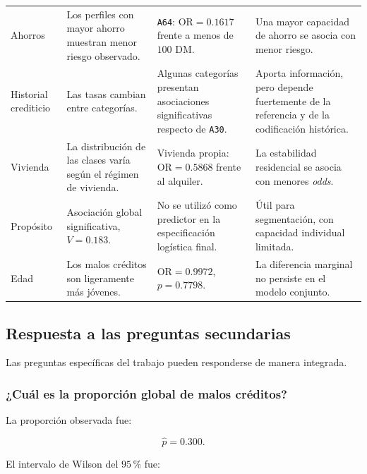 \begin{table}[H]
\begin{tabularx}{\textwidth}{
        @{}
        >{\raggedright\arraybackslash}p{2.7cm}
        >{\raggedright\arraybackslash}p{4.1cm}
        >{\raggedright\arraybackslash}p{4.0cm}
        X
        @{}
    }
        Ahorros
        & Los perfiles con mayor ahorro muestran menor riesgo observado.
        & \texttt{A64}: \(\mathrm{OR}=0.1617\) frente a menos de
          \(100\) DM.
        & Una mayor capacidad de ahorro se asocia con menor riesgo. \\

        Historial crediticio
        & Las tasas cambian entre categorías.
        & Algunas categorías presentan asociaciones significativas
          respecto de \texttt{A30}.
        & Aporta información, pero depende fuertemente de la referencia
          y de la codificación histórica. \\

        Vivienda
        & La distribución de las clases varía según el régimen de
          vivienda.
        & Vivienda propia:
          \(\mathrm{OR}=0.5868\) frente al alquiler.
        & La estabilidad residencial se asocia con menores
          \textit{odds}. \\

        Propósito
        & Asociación global significativa, \(V=0.183\).
        & No se utilizó como predictor en la especificación logística
          final.
        & Útil para segmentación, con capacidad individual limitada. \\

        Edad
        & Los malos créditos son ligeramente más jóvenes.
        & \(\mathrm{OR}=0.9972\), \(p=0.7798\).
        & La diferencia marginal no persiste en el modelo conjunto. \\

        \bottomrule
    \end{tabularx}
\end{table}

\subsection{Respuesta a las preguntas secundarias}

Las preguntas específicas del trabajo pueden responderse de manera
integrada.

\subsubsection{¿Cuál es la proporción global de malos créditos?}

La proporción observada fue:

\[
\widehat{p}
=
0.300.
\]

El intervalo de Wilson del \(95\,\%\) fue:

